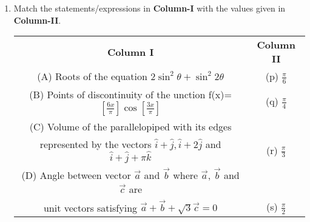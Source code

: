 \begin{enumerate}[label=\arabic*.,ref=\thesubsection.\theenumi]
\item Match the statements/expressions in \textbf{Column-I} with the values given in \textbf{Column-II}.
\begin{table}[ht!]
\centering
\begin{tabular}{c c} 
 \textbf{Column I} & \textbf{Column II}\\ [0.5ex] 
 (A) Roots of the equation
     $2\sin^{2}\theta + \sin^{2}2\theta$                    &(p) $\frac{\pi}{6}$\\ 
 (B) Points of discontinuity of the unction
     f(x)=$[\frac{6x}{\pi}]\cos[\frac{3x}{\pi}]$            &(q) $\frac{\pi}{4}$\\
 (C) Volume of the parallelopiped with its edges\\
     represented by the vectors
     $\hat{i}+\hat{j},\hat{i}+2\hat{j}$ 
     and $\hat{i}+\hat{j}+\pi\hat{k}$                       &(r) $\frac{\pi}{3}$\\
 (D) Angle between vector $\overrightarrow{a}$
     and $\overrightarrow{b}$ where $\overrightarrow{a}$, 
     $\overrightarrow{b}$ and $\overrightarrow{c}$ are\\ 
     unit vectors satisfying $\overrightarrow{a}  
     + \overrightarrow{b} + \sqrt{3}\overrightarrow{c}=0$   &(s) $\frac{\pi}{2}$\\[1ex]
                                                            
\end{tabular}
\end{table}


\end{enumerate}

